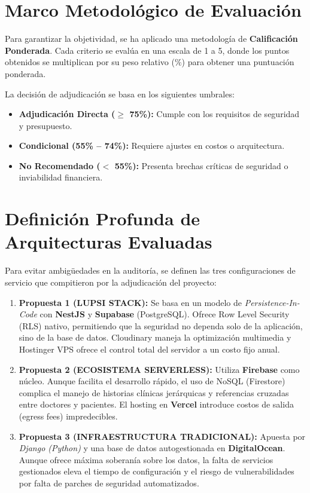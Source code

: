 \documentclass[a4paper,12pt]{article}
\begin{document}
\section{Marco Metodológico de Evaluación}
Para garantizar la objetividad, se ha aplicado una metodología de \textbf{Calificación Ponderada}. Cada criterio se evalúa en una escala de 1 a 5, donde los puntos obtenidos se multiplican por su peso relativo ($\%$) para obtener una puntuación ponderada. 

La decisión de adjudicación se basa en los siguientes umbrales:
\begin{itemize}
    \item \textbf{Adjudicación Directa ($\ge$ 75\%):} Cumple con los requisitos de seguridad y presupuesto.
    \item \textbf{Condicional (55\% -- 74\%):} Requiere ajustes en costos o arquitectura.
    \item \textbf{No Recomendado ($<$ 55\%):} Presenta brechas críticas de seguridad o inviabilidad financiera.
\end{itemize}

\section{Definición Profunda de Arquitecturas Evaluadas}
Para evitar ambigüedades en la auditoría, se definen las tres configuraciones de servicio que compitieron por la adjudicación del proyecto:

\begin{enumerate}
    \item \textbf{Propuesta 1 (LUPSI STACK):} Se basa en un modelo de \textit{Persistence-In-Code} con \textbf{NestJS} y \textbf{Supabase} (PostgreSQL). Ofrece Row Level Security (RLS) nativo, permitiendo que la seguridad no dependa solo de la aplicación, sino de la base de datos. Cloudinary maneja la optimización multimedia y Hostinger VPS ofrece el control total del servidor a un costo fijo anual.
    
    \item \textbf{Propuesta 2 (ECOSISTEMA SERVERLESS):} Utiliza \textbf{Firebase} como núcleo. Aunque facilita el desarrollo rápido, el uso de NoSQL (Firestore) complica el manejo de historias clínicas jerárquicas y referencias cruzadas entre doctores y pacientes. El hosting en \textbf{Vercel} introduce costos de salida (egress fees) impredecibles.
    
    \item \textbf{Propuesta 3 (INFRAESTRUCTURA TRADICIONAL):} Apuesta por \textit{Django (Python)} y una base de datos autogestionada en \textbf{DigitalOcean}. Aunque ofrece máxima soberanía sobre los datos, la falta de servicios gestionados eleva el tiempo de configuración y el riesgo de vulnerabilidades por falta de parches de seguridad automatizados.
\end{enumerate}
\end{document}

